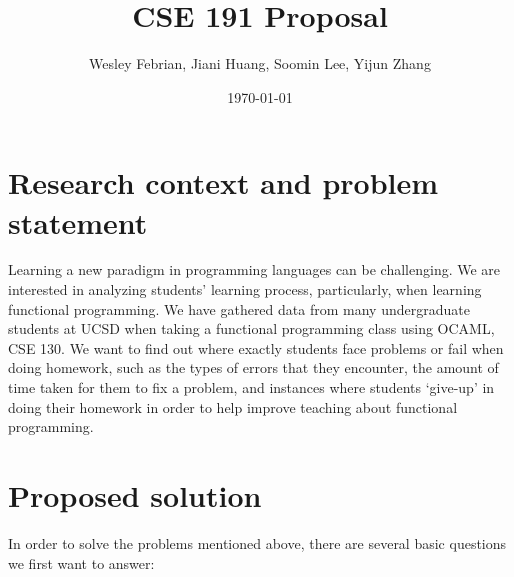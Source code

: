 \documentclass[dvips,12pt]{article}
\begin{document}

\title{\textbf{CSE 191 Proposal}}
\author{Wesley Febrian, Jiani Huang, Soomin Lee, Yijun Zhang}
\date{\today}



\maketitle


\section{Research context and problem statement}

Learning a new paradigm in programming languages can be challenging. We are interested in analyzing students’ learning process, particularly, when learning functional programming. We have gathered data from many undergraduate students at UCSD when taking a functional programming class using OCAML, CSE 130. We want to find out where exactly students face problems or fail when doing homework, such as the types of errors that they encounter, the amount of time taken for them to fix a problem, and instances where students ‘give-up’ in doing their homework in order to help improve teaching about functional programming.


\section{Proposed solution}

In order to solve the problems mentioned above, there are several basic questions we first want to answer: 
\end{document}
